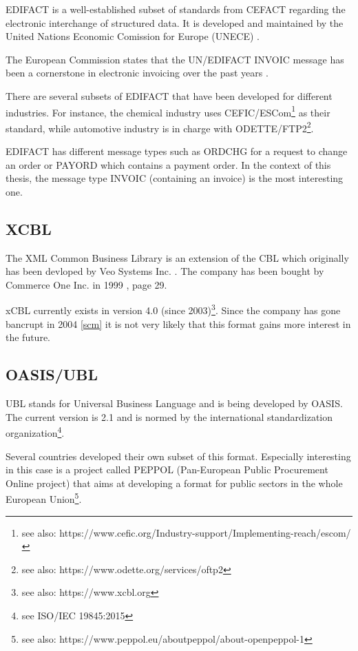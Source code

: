 EDIFACT is a well-established \cite{basware} subset of standards from CEFACT regarding the electronic interchange of structured data. It is developed and maintained by the United Nations Economic Comission for Europe (UNECE) \cite{unece}.

The European Commission states that the UN/EDIFACT INVOIC message has been a cornerstone in electronic invoicing over the past years \cite{ECInvcStandardization, page 14}.

There are several subsets of EDIFACT that have been developed for different industries. For instance, the chemical industry uses CEFIC/ESCom\footnote{see also: https://www.cefic.org/Industry-support/Implementing-reach/escom/} as their standard, while automotive industry is in charge with ODETTE/FTP2\footnote{see also: https://www.odette.org/services/oftp2}.

EDIFACT has different message types such as ORDCHG for a request to change an order or PAYORD which contains a payment order. In the context of this thesis, the message type INVOIC (containing an invoice) is the most interesting one.

\subsection{XCBL}
\label{sec2.1.2}

The XML Common Business Library is an extension of the CBL which originally has been devloped by Veo Systems Inc. \cite{coverpages}. The company has been bought by Commerce One Inc. in 1999 \cite{co}, page 29. 

xCBL currently exists in version 4.0 (since 2003)\footnote{see also: https://www.xcbl.org}. Since the company has gone bancrupt in 2004 \ref{scm} it is not very likely that this format gains more interest in the future.

\subsection{OASIS/UBL}
\label{sec2.1.3}

UBL stands for Universal Business Language and is being developed by OASIS. The current version is 2.1 and is normed by the international standardization organization\footnote{see ISO/IEC 19845:2015}.

Several countries developed their own subset of this format. Especially interesting in this case is a project called PEPPOL (Pan-European Public Procurement Online project) that aims at developing a format for public sectors in the whole European Union\footnote {see also: https://www.peppol.eu/about\textunderscore peppol/about-openpeppol-1}. 


